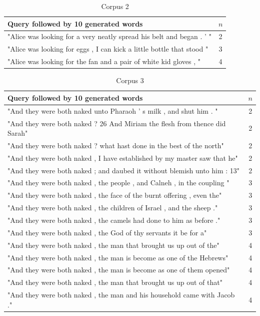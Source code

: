 \documentclass[a4paper,12pt]{article}
\begin{document}
\begin{table}
\begin{tabular}{| l |c|}
\hline
Query followed by 10 generated words & $n$ \\ \hline
"Alice was looking for a very neatly spread his belt and began . ' " & 2\\ \hline
"Alice was looking for eggs , I can kick a little bottle that stood "& 3 \\ \hline
"Alice was looking for the fan and a pair of white kid gloves , " & 4 \\ \hline
\end{tabular}
\caption{Corpus 2}
\label{tab:corpus2}
\end{table}

\begin{table}
\begin{tabular}{| l |c|}
\hline
Query followed by 10 generated words & $n$ \\ \hline
"And they were both naked unto Pharaoh ' s milk , and shut him . " & 2\\ \hline
"And they were both naked ? 26 And Miriam the flesh from thence did Sarah"& 2 \\ \hline
"And they were both naked ? what hast done in the best of the north" & 2 \\ \hline
"And they were both naked , I have established by my master saw that he" & 2 \\ \hline
"And they were both naked ; and daubed it without blemish unto him : 13" & 2 \\ \hline

"And they were both naked , the people , and Calneh , in the coupling " & 3 \\ \hline
"And they were both naked , the face of the burnt offering , even the" & 3 \\ \hline
"And they were both naked , the children of Israel , and the sheep ." & 3 \\ \hline
"And they were both naked , the camels had done to him as before ." & 3 \\ \hline
"And they were both naked , the God of thy servants it be for a" & 3 \\ \hline

"And they were both naked , the man that brought us up out of the" & 4 \\ \hline
"And they were both naked , the man is become as one of the Hebrews" & 4 \\ \hline
"And they were both naked , the man is become as one of them opened" & 4 \\ \hline
"And they were both naked , the man that brought us up out of that" & 4 \\ \hline
"And they were both naked , the man and his household came with Jacob ." & 4 \\ \hline

\end{tabular}
\caption{ Corpus 3}
\label{tab:corpus3}
\end{table}
\end{document}
